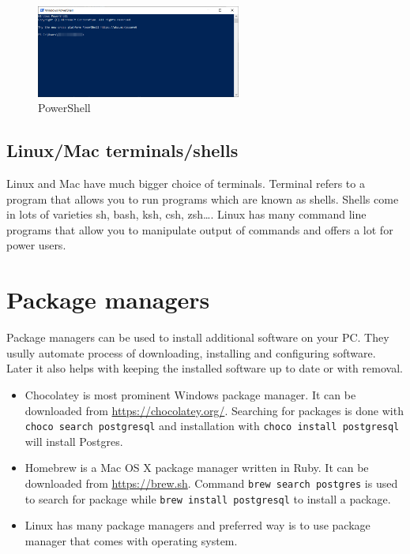 \begin{figure}[htbp]
    \centering
    \includegraphics[width=0.6\textwidth]{images/powershell}
    \caption{PowerShell\label{fig:PowerShell}}
\end{figure}

\subsection{Linux/Mac terminals/shells}\label{subsec:linux/mac-terminals/shells}

Linux and Mac have much bigger choice of terminals.
Terminal refers to a program that allows you to run
programs which are known as shells. Shells come in lots of varieties sh, bash, ksh, csh, zsh\dots.
Linux has many command line programs that allow you to manipulate output of commands and
offers a lot for power users.


\section{Package managers}

Package managers can be used to install additional software on your PC. They usully automate process of
downloading, installing and configuring software. Later it also helps with keeping the installed software
up to date or with removal.

\begin{itemize}[leftmargin=*]
    \item Chocolatey is most prominent Windows package manager. It can be downloaded from \href{https://chocolatey.org/}{https://chocolatey.org/}.
          Searching for packages is done with \texttt{choco search postgresql}
          and installation with \texttt{choco install postgresql} will install Postgres.
    \item Homebrew is a Mac OS X package manager written in Ruby.
          It can be downloaded from \href{https://brew.sh}{https://brew.sh}.
          Command \texttt{brew search postgres}
          is used to search for package while \texttt{brew install postgresql} to install a package.
    \item Linux has many package managers and preferred way is to use package manager
          that comes with operating system.
\end{itemize}